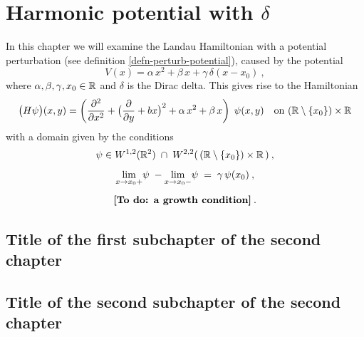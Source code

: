 \chapter{Harmonic potential with \texorpdfstring{$\delta$}{δ}}
In this chapter we will examine the Landau Hamiltonian with a potential perturbation (see definition \ref{defn-perturb-potential}), caused by the potential
\begin{equation*}
    V(x) = \alpha \, x^2 + \beta \, x + \gamma \, \delta(x - x_0) \: ,
\end{equation*}
where $\alpha, \beta, \gamma, x_0 \in \mathbb{R}$ and $\delta$ is the Dirac delta. This gives rise to the Hamiltonian
\begin{equation*}
    \big( H\psi \big)(x, y) = \left( \frac{\partial ^2}{\partial x^2} + \big( \frac{\partial }{\partial y} + bx \big)^2 + \alpha \, x^2 + \beta \, x \right) \; \psi(x,y)
    \quad \text{on } (\mathbb{R} \setminus \{ x_0 \}) \times \mathbb{R}
\end{equation*}
with a domain given by the conditions
\begin{gather*}
    \psi \in W^{1,2}(\mathbb{R}^2) \; \cap \; W^{2,2}( \,(\mathbb{R} \setminus \{ x_0 \}) \times \mathbb{R} \, ) \: , \\[5pt]
    \lim_{x \to x_0 +} \!\psi\; - \lim_{x \to x_0 -} \!\psi\; = \; \gamma \, \psi(x_0) \: , \\[5pt]
    \text{\textbf{[To do: a growth condition]}} \: .
\end{gather*}

\section{Title of the first subchapter of the second chapter}

\section{Title of the second subchapter of the second chapter}
